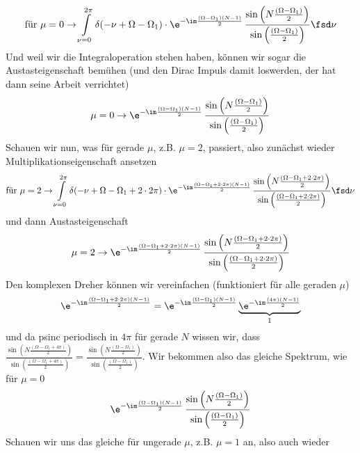 \begin{ExCalc}
\begin{align}
\text{für   }\mu=0\rightarrow
\int\limits_{\nu=0}^{2\pi}
\delta(-\nu+\Omega-\Omega_1)
\cdot
\e^{-\im\frac{(\Omega-\Omega_1)(N-1)}{2}}\,
\frac{\sin\left(N\frac{(\Omega-\Omega_1)}{2}\right)}{\sin\left(\frac{(\Omega-\Omega_1)}{2}\right)}\fsd \nu
\end{align}
Und weil wir die Integraloperation stehen haben, können wir sogar die
Austasteigenschaft bemühen (und den Dirac Impuls damit loswerden, der hat dann seine Arbeit verrichtet)
\begin{align}
\mu=0\rightarrow
\e^{-\im\frac{(\Omega-\Omega_1)(N-1)}{2}}\,
\frac{\sin\left(N\frac{(\Omega-\Omega_1)}{2}\right)}{\sin\left(\frac{(\Omega-\Omega_1)}{2}\right)}
\end{align}
%
Schauen wir nun, was für gerade $\mu$, z.B. $\mu=2$, passiert, also zunächst wieder Multiplikationseigenschaft
ansetzen
\begin{align}
\text{für   }\mu=2\rightarrow
\int\limits_{\nu=0}^{2\pi}
\delta(-\nu+\Omega-\Omega_1+2 \cdot 2\pi)
\cdot
\e^{-\im\frac{(\Omega-\Omega_1 +2 \cdot  2\pi)(N-1)}{2}}\,
\frac{\sin\left(N\frac{(\Omega-\Omega_1 + 2 \cdot 2\pi)}{2}\right)}{\sin\left(\frac{(\Omega-\Omega_1 + 2 \cdot 2\pi)}{2}\right)}\fsd \nu
\end{align}
und dann Austasteigenschaft
\begin{align}
\mu=2\rightarrow
\e^{-\im\frac{(\Omega-\Omega_1 +2 \cdot  2\pi)(N-1)}{2}}\,
\frac{\sin\left(N\frac{(\Omega-\Omega_1 + 2 \cdot 2\pi)}{2}\right)}{\sin\left(\frac{(\Omega-\Omega_1 + 2 \cdot 2\pi)}{2}\right)}
\end{align}
%
Den komplexen Dreher können wir vereinfachen (funktioniert für alle geraden $\mu$)
\begin{align}
\e^{-\im\frac{(\Omega-\Omega_1 + 2 \cdot 2\pi)(N-1)}{2}} =
\e^{-\im\frac{(\Omega-\Omega_1)(N-1)}{2}}
\underbrace{\e^{-\im\frac{(4\pi)(N-1)}{2}}}_{1}
\end{align}
und da psinc periodisch in $4\pi$ für gerade $N$ wissen wir, dass
$\frac{\sin\left(N\frac{(\Omega-\Omega_1 + 4\pi)}{2}\right)}{\sin\left(\frac{(\Omega-\Omega_1 + 4\pi)}{2}\right)} = \frac{\sin\left(N\frac{(\Omega-\Omega_1)}{2}\right)}{\sin\left(\frac{(\Omega-\Omega_1)}{2}\right)}$.
Wir bekommen also das gleiche Spektrum, wie für $\mu=0$
\begin{align}
\e^{-\im\frac{(\Omega-\Omega_1)(N-1)}{2}}\,
\frac{\sin\left(N\frac{(\Omega-\Omega_1)}{2}\right)}{\sin\left(\frac{(\Omega-\Omega_1)}{2}\right)}
\end{align}
%
Schauen wir uns das gleiche für ungerade $\mu$, z.B. $\mu=1$ an, also auch wieder

\end{ExCalc}
